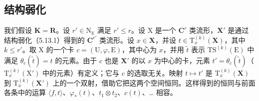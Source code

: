\subsection{结构弱化}

我们假设 \(\mathbf{K} = \mathbf{R}\)。设 \(r' \in \mathrm{N}_{\mathbb{K}}\) 满足 \(r' \leqslant r\)。设 X 是一个 \(\mathbf{C}^{r}\) 类流形，\(\mathbf{X}'\) 是通过结构弱化（5.13.1）得到的 \(\mathbf{C}^{r'}\) 类流形。设 \(x \in \mathbf{X}\)，并设 \(t \in \mathrm{T}_x^{(k)}(\mathbf{X})\)，其中 \(k \leqslant r'\)。取 X 的一个卡 \(c = (\mathrm{U}, \varphi, \mathrm{E})\)，其中心为 \(x\)，并用 \(\tilde{t}\) 表示 \(\mathrm{TS}^{(k)}(\mathrm{E})\) 中满足 \(\theta_c(\tilde{t}) = t\) 的元素。由于 \(c\) 也是 \(\mathbf{X}'\) 的以 \(x\) 为中心的卡，元素 \(t' = \theta_c(\tilde{t})\)（\(\mathrm{T}_x^{(k)}(\mathrm{X}')\) 中的元素）有定义；它与 \(c\) 的选取无关。映射 \(t \mapsto t'\) 是 \(\mathrm{T}_x^{(k)}(\mathbf{X})\) 到 \(\mathrm{T}_x^{(k)}(\mathbf{X}')\) 上的一个双射，借助它把这两个空间恒同。这样得到的恒同与前面各条中的运算 \(\langle f, t \rangle\)、\(\varphi_*(t)\)、\(t_1 \otimes t_2\)、\(c(t)\)、\ldots{} 相容。

